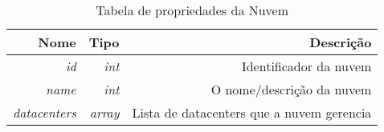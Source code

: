 \begin{table}[!htb]
    \centering
    \caption[Representação da Cloud]{Tabela de propriedades da Nuvem
    \label{tab:cloud-shape}}
    \begin{tabular}{rrr}
        \toprule
            Nome & Tipo & Descrição \\ 
        \midrule
            \textit{id} & \textit{int} & Identificador da nuvem \\
            \textit{name} & \textit{int} & O nome/descrição da nuvem \\
            \textit{datacenters} & \textit{array} & Lista de datacenters que a nuvem gerencia \\
        \bottomrule
    \end{tabular}
\end{table}


